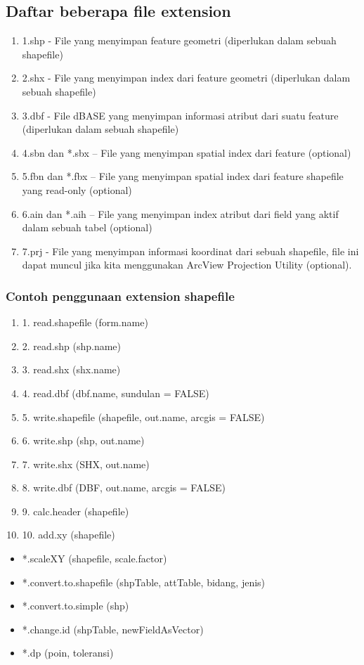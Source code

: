 \subsection{Daftar beberapa file extension}
\begin{enumerate}
    \item 1.shp - File yang menyimpan feature geometri (diperlukan dalam sebuah shapefile) 
    \item 2.shx - File yang menyimpan index dari feature geometri (diperlukan dalam sebuah shapefile) 
    \item 3.dbf - File dBASE yang menyimpan informasi atribut dari suatu feature (diperlukan dalam sebuah shapefile) 
    \item 4.sbn dan *.sbx – File yang menyimpan spatial index dari feature (optional) 
    \item 5.fbn dan *.fbx – File yang menyimpan spatial index dari feature shapefile yang read-only (optional) 
    \item 6.ain dan *.aih – File yang menyimpan index atribut dari field yang aktif dalam sebuah tabel (optional) 
    \item 7.prj - File yang menyimpan informasi koordinat dari sebuah shapefile, file ini dapat muncul jika kita menggunakan ArcView Projection Utility (optional).
\end{enumerate}
\subsubsection{Contoh penggunaan extension shapefile}
\begin{enumerate}
    \item 1. read.shapefile (form.name) 
    \item 2. read.shp (shp.name) 
    \item 3. read.shx (shx.name)
    \item 4. read.dbf (dbf.name, sundulan = FALSE)
    \item 5. write.shapefile (shapefile, out.name, arcgis = FALSE) 
    \item 6. write.shp (shp, out.name) 
    \item 7. write.shx (SHX, out.name)
    \item 8. write.dbf (DBF, out.name, arcgis = FALSE) 
    \item 9. calc.header (shapefile) 
    \item 10. add.xy (shapefile)
\end{enumerate}
\begin{itemize}
    \item *.scaleXY (shapefile, scale.factor)
    \item *.convert.to.shapefile (shpTable, attTable, bidang, jenis) 
    \item *.convert.to.simple (shp)
    \item *.change.id (shpTable, newFieldAsVector) 
    \item *.dp (poin, toleransi)
\end{itemize}

